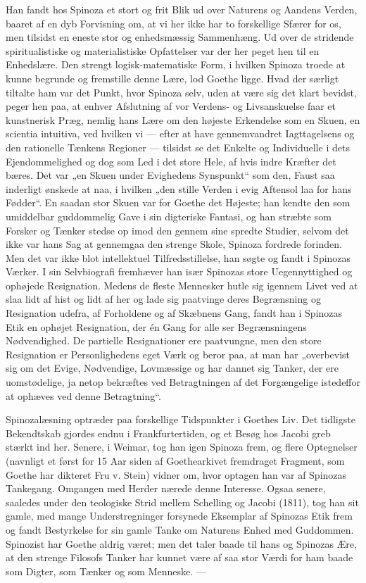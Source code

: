 \documentclass[12pt,a4paper,openany]{book}
\newcommand{\opage}[1]{\marginnote{\footnotesize\textit{[#1]}}}
\begin{document}
Han fandt hos Spinoza et stort og frit Blik ud over Naturens
og Aandens Verden, baaret af en dyb Forvisning om, at
vi her ikke har to forskellige Sfærer for os, men tilsidst en
eneste stor og enhedsmæssig Sammenhæng. Ud over de stridende
spiritualistiske og materialistiske Opfattelser var der her
peget hen til en Enhedslære. Den strengt logisk-matematiske
Form, i hvilken Spinoza troede at kunne begrunde og fremstille
denne Lære, lod Goethe ligge. Hvad der særligt tiltalte ham
var det Punkt, hvor Spinoza selv, uden at være sig det klart
bevidst, peger hen paa, at enhver Afslutning af vor Verdens- og
Livsanskuelse faar et kunstnerisk Præg, nemlig hans Lære
om den højeste Erkendelse som en Skuen, en scientia intuitiva,
ved hvilken vi --- efter at have gennemvandret Iagttagelsens og
den rationelle Tænkens Regioner --- tilsidst se det Enkelte og
Individuelle i dets Ejendommelighed og dog som Led i det
store Hele, af hvis indre Kræfter det bæres. Det var „en
Skuen under Evighedens Synspunkt“ som den, Faust saa inderligt
ønskede at naa, i hvilken „den stille Verden i evig Aftensol
laa for hans Fødder“. En saadan stor Skuen var for Goethe
det Højeste; han kendte den som umiddelbar guddommelig Gave
i sin digteriske Fantasi, og han stræbte som Forsker og Tænker
stedse op imod den gennem sine spredte Studier, selvom det
ikke var hans Sag at gennemgaa den strenge Skole, Spinoza
fordrede forinden. Men det var ikke blot intellektuel Tilfredsstillelse,
han søgte og fandt i Spinozas Værker. I sin Selvbiografi
fremhæver han især Spinozas store Uegennyttighed og
ophøjede Resignation. Medens de fleste Mennesker hutle sig
igennem Livet ved at slaa lidt af hist og lidt af her og lade
sig paatvinge deres Begrænsning og Resignation udefra, af Forholdene
og af Skæbnens Gang, fandt han i Spinozas Etik en
ophøjet Resignation, der én Gang for alle ser Begrænsningens
Nødvendighed. De partielle Resignationer ere paatvungne, men
den store Resignation er Personlighedens eget Værk og beror
\setcounter{footnote}{0}%
\opage{164}paa, at man har „overbevist sig om det Evige, Nødvendige,
Lovmæssige og har dannet sig Tanker, der ere uomstødelige, ja
netop bekræftes ved Betragtningen af det Forgængelige istedeffor
at ophæves ved denne Betragtning“.

Spinozalæsning optræder paa forskellige Tidspunkter i Goethes
Liv. Det tidligste Bekendtskab gjordes endnu i Frankfurtertiden,
og et Besøg hos Jacobi greb stærkt ind her. Senere, i Weimar,
tog han igen Spinoza frem, og flere Optegnelser (navnligt et
først for 15 Aar siden af Goethearkivet fremdraget Fragment,
som Goethe har dikteret Fru v. Stein) vidner om, hvor optagen
han var af Spinozas Tankegang. Omgangen med Herder nærede
denne Interesse. Ogsaa senere, saaledes under den teologiske
Strid mellem Schelling og Jacobi (1811), tog han sit gamle,
med mange Understregninger forsynede Eksemplar af Spinozas
Etik frem og fandt Bestyrkelse for sin gamle Tanke om Naturens
Enhed med Guddommen. Spinozist har Goethe aldrig
været; men det taler baade til hans og Spinozas Ære, at den
strenge Filosofs Tanker har kunnet være af saa stor Værdi for
ham baade som Digter, som Tænker og som Menneske. ---
\end{document}
